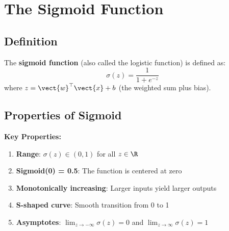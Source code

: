 
\section{The Sigmoid Function}

\subsection{Definition}

\begin{definitionbox}
The \textbf{sigmoid function} (also called the logistic function) is defined as:
\[
\sigma(z) = \frac{1}{1 + e^{-z}}
\]
where $z = \vect{w}^\top \vect{x} + b$ (the weighted sum plus bias).
\end{definitionbox}

\subsection{Properties of Sigmoid}

\begin{center}
\end{center}

\textbf{Key Properties:}

\begin{enumerate}
    \item \textbf{Range}: $\sigma(z) \in (0, 1)$ for all $z \in \R$
    \item \textbf{Sigmoid(0) = 0.5}: The function is centered at zero
    \item \textbf{Monotonically increasing}: Larger inputs yield larger outputs
    \item \textbf{S-shaped curve}: Smooth transition from 0 to 1
    \item \textbf{Asymptotes}: $\lim_{z \to -\infty} \sigma(z) = 0$ and $\lim_{z \to \infty} \sigma(z) = 1$
\end{enumerate}

